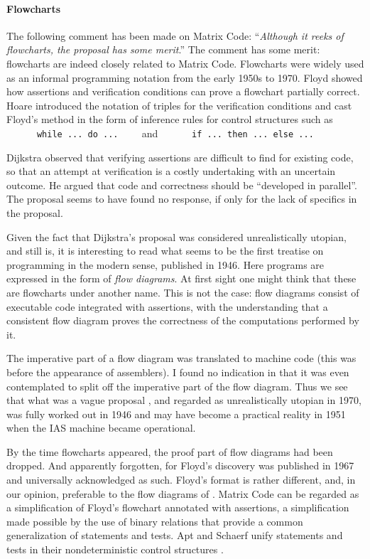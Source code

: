 \documentclass[preprint,11pt]{elsarticle}
\begin{document}
\paragraph{Flowcharts}
The following comment has been made on Matrix Code:
``\emph{Although it reeks of flowcharts,
the proposal has some merit}.''
The comment has some merit:
flowcharts are indeed closely related to Matrix Code.
Flowcharts were widely used
as an informal programming notation
from the early 1950s to 1970.
Floyd \cite{fld67} showed
how assertions and verification conditions
can prove a flowchart partially correct.
Hoare \cite{hr69} introduced the notation of triples
for the verification conditions
and cast Floyd's method in the form of inference rules
for control structures such as \\
\verb"      while ... do ...    "
and 
\verb"      if ... then ... else ..."

Dijkstra observed that verifying assertions
are difficult to find for existing code,
so that an attempt at verification is a costly undertaking
with an uncertain outcome. 
He argued \cite{djk68a,djkInfotech71}
that code and correctness should be ``developed in parallel''.
The proposal seems to have found no response,
if only for the lack of specifics in the proposal.

Given the fact that Dijkstra's proposal was considered
unrealistically utopian, and still is,
it is interesting to read
what seems to be the first treatise \cite{gldNmn46}
on programming in the modern sense, published in 1946.
Here programs are expressed in the form of \emph{flow diagrams}.
At first sight one might think
that these are flowcharts under another name.
This is not the case:
flow diagrams consist of executable code
integrated with assertions, with the understanding
that a consistent flow diagram proves the correctness
of the computations performed by it.

The imperative part of a flow diagram was translated
to machine code
(this was before the appearance of assemblers).
I found no indication in \cite{gldNmn46} 
that it was even contemplated to split off
the imperative part of the flow diagram.
Thus we see that what was a vague proposal \cite{djk68a,djkInfotech71},
and regarded as unrealistically utopian in 1970,
was fully worked out in 1946
and may have become a practical reality in 1951
when the IAS machine became operational.

By the time flowcharts appeared,
the proof part of flow diagrams had been dropped.
And apparently forgotten,
for Floyd's discovery was published in 1967
and universally acknowledged as such.
Floyd's format is rather different,
and, in our opinion,
preferable to the flow diagrams of \cite{gldNmn46}.
Matrix Code can be regarded as a simplification
of Floyd's flowchart annotated with assertions,
a simplification made possible by the use of binary relations
that provide a common generalization of statements and tests.
Apt and Schaerf unify statements and tests
in their nondeterministic control structures \cite{ptSchrf97}.
\end{document}
